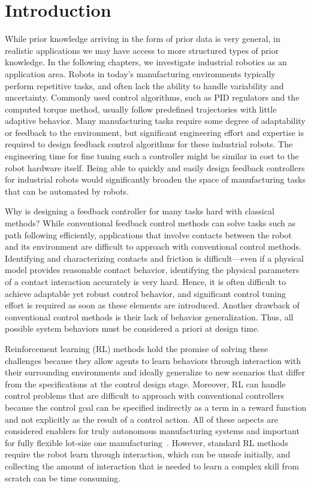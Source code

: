 \section{Introduction}\label{sec:introduction}
%
While prior knowledge arriving in the form of prior data is very general, in realistic applications we may have access to more structured types of prior knowledge. In the following chapters, we investigate industrial robotics as an application area.
Robots in today's manufacturing environments typically perform repetitive tasks, and often lack the ability to handle variability and uncertainty. 
Commonly used control algorithms, such as PID regulators and the computed torque method, usually follow predefined trajectories with little adaptive behavior.
Many manufacturing tasks require some degree of adaptability or feedback to the environment, but significant engineering effort and expertise is required to design feedback control algorithms for these industrial robots.
The engineering time for fine tuning such a controller might be similar in cost to the robot hardware itself.
Being able to quickly and easily design feedback controllers for industrial robots would significantly broaden the space of manufacturing tasks that can be automated by robots.

Why is designing a feedback controller for many tasks hard with classical methods? While conventional feedback control methods can solve tasks such as path following efficiently, applications that involve contacts between the robot and its environment are difficult to approach with conventional control methods.
Identifying and characterizing contacts and friction is difficult---even if a physical model provides reasonable contact behavior, identifying the physical parameters of a contact interaction accurately is very hard.
Hence, it is often difficult to achieve adaptable yet robust control behavior, and significant control tuning effort is required as soon as these elements are introduced.
Another drawback of conventional control methods is their lack of behavior generalization.
Thus, all possible system behaviors must be considered a priori at design time.

Reinforcement learning (RL) methods hold the promise of solving these challenges because they allow agents to learn behaviors through interaction with their surrounding environments and ideally generalize to new scenarios that differ from the specifications at the control design stage.
Moreover, RL can handle control problems that are difficult to approach with conventional controllers because the control goal can be specified indirectly as a term in a reward function and not explicitly as the result of a control action.  
All of these aspects are considered enablers for truly autonomous manufacturing systems and important for fully flexible lot-size one manufacturing~\citep{lotsizeone}.
However, standard RL methods require the robot learn through interaction, which can be unsafe initially, and collecting the amount of interaction that is needed to learn a complex skill from scratch can be time consuming.

